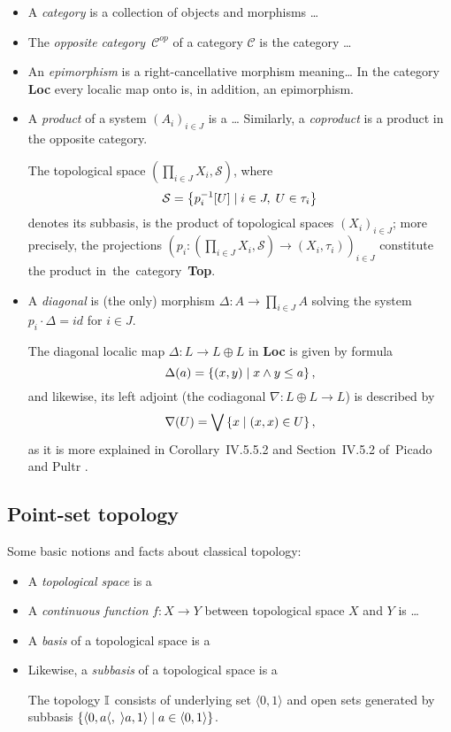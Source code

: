 \begin{itemize}
\item A \emph{category} is a collection of objects and morphisms \ldots
\item The \emph{opposite category}~$\mathcal{C}^{op}$ of a category
$\mathcal{C}$ is the category \ldots
\item An \emph{epimorphism} is a right-cancellative morphism meaning\ldots
In the category {\bf Loc} every localic map onto is, in addition, an
epimorphism.
\item A \emph{product} of a system $\left(A_i\right)_{i\in J}$ is a \ldots
Similarly, a \emph{coproduct} is a product in the opposite category.
\begin{fact}
  The topological space $\left( \prod_{i\in J} X_i, \mathcal{S} \right)$, where
  \[
    \mathcal{S} = \left\{ p_{i}^{-1}[U] \mid i\in J, \; U\in \tau_i \right\}
  \]
  denotes its subbasis, is the product of topological spaces $\left( X_i
  \right)_{i\in J}$;
  more precisely, the projections $\left( p_i\colon \left(\prod_{i\in J} X_i,
  \mathcal{S}\right) \to \left(X_i, \tau_i\right) \right)_{i\in J}$
  constitute the product in~the~category~{\bf Top}.
\end{fact}

\item A \emph{diagonal} is (the only) morphism $\Delta\colon A \to \prod_{i\in
J} A$ solving the system $p_i\cdot \Delta = id$ for $i \in J$.
  \begin{exmpl} \label{(co)diag-in-Loc}
    The diagonal localic map $\Delta\colon L \to L \oplus L$ in {\bf Loc} is
    given by formula
    \[
      \Delta(a) = \left\{ (x, y) \mid x \wedge y \leq a \right\},
    \]
    and likewise, its left adjoint (the codiagonal $\nabla\colon L \oplus L \to
    L$) is described by
    \[
      \nabla(U) = \bigvee \left\{ x \mid (x, x)\in U \right\},
    \]
    as it is more explained in Corollary~IV.5.5.2 and Section~IV.5.2 of~Picado
    and Pultr \cite{picado-pultr12}.
  \end{exmpl}
\end{itemize}


\subsection*{Point-set topology}

Some basic notions and facts about classical topology:

\begin{itemize}
\item A \emph{topological space} is a
\item A \emph{continuous function} $f\colon X \to Y$ between topological space
$X$ and $Y$ is \ldots
\item A \emph{basis} of a topological space is a
\item Likewise, a \emph{subbasis} of a topological space is a
\begin{exmpl}
  The topology $\mathbb{I}$ consists of underlying set $\langle 0, 1 \rangle$ and open
  sets generated by subbasis $\{ \langle 0, a \langle, \; \rangle a, 1 \rangle
  \mid a\in \langle 0, 1 \rangle \}$.
\end{exmpl}
\end{itemize}

